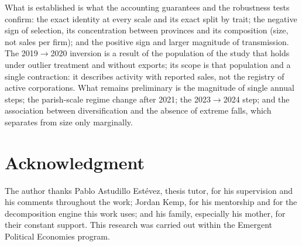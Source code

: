\documentclass[conference]{IEEEtran}
\begin{document}
What is established is what the accounting guarantees and the robustness
tests confirm: the exact identity at every scale and its exact split by
trait; the negative sign of selection, its concentration between
provinces and its composition (size, not sales per firm); and the positive sign and larger magnitude of transmission. The
2019$\to$2020 inversion is a result of the population of the study that
holds under outlier treatment and without exports; its scope is that
population and a single contraction: it describes activity with reported
sales, not the registry of active corporations. What remains preliminary
is the magnitude of single annual steps; the parish-scale regime change after 2021; the
2023$\to$2024 step; and the association between diversification and the
absence of extreme falls, which separates from size only marginally.

\section*{Acknowledgment}

The author thanks Pablo Astudillo Est\'evez, thesis tutor, for his
supervision and his comments throughout the work; Jordan Kemp, for his
mentorship and for the decomposition engine this work uses; and his
family, especially his mother, for their constant support. This research
was carried out within the Emergent Political Economies program.
\end{document}
